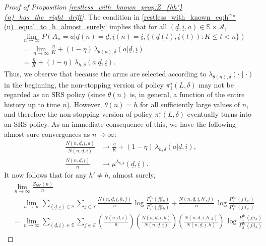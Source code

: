 \begin{proof}[Proof of Proposition \ref{restless_with_known_prop:Z_{hh'}(n)_has_the_right_drift}]
The condition in \eqref{restless_with_known_eq:h^*(n)_equal_to_h_almost_surely} implies that for all $(\underline{d},\underline{i},a)\in\mathbb{S}\times\mathcal{A}$,
\begin{align}
	&\lim\limits_{n\to\infty} P(A_n=a|\underline{d}(n)=\underline{d},\underline{i}(n)=\underline{i},\{(\underline{d}(t),\underline{i}(t)):K\leq t< n\})\nonumber\\
	&=\lim\limits_{n\to\infty}\frac{\eta}{K}+(1-\eta)\,\lambda_{\theta(n),\delta}(a|\underline{d},\underline{i})\nonumber\\
	&=\frac{\eta}{K}+(1-\eta)\,\lambda_{h,\delta}(a|\underline{d},\underline{i}).
\end{align}
Thus, we observe that because the arms are selected according to $\lambda_{\theta(n), \delta}(\cdot\mid \cdot)$ in the beginning, the non-stopping version of policy $\pi_1^\star(L, \delta)$ may not be regarded as an SRS policy (since $\theta(n)$ is, in general, a function of the entire history up to time $n$). However, $\theta(n)=h$ for all sufficiently large values of $n$, and therefore the non-stopping version of policy $\pi_1^\star(L, \delta)$ eventually turns into an SRS policy. As an immediate consequence of this, we have the following almost sure convergences as $n\to\infty$:
\begin{align}
	\frac{N(n,\underline{d},\underline{i},a)}{N(n,\underline{d},\underline{i})}&\longrightarrow \frac{\eta}{K}+(1-\eta)\,\lambda_{h,\delta}(a|\underline{d},\underline{i}),\label{restless_with_known_eq:limit_N(n,d,i,a)/N(n,d,i)}\\
	\frac{N(n,\underline{d},\underline{i})}{n}&\longrightarrow \mu^{\lambda_{h,\delta}}(\underline{d},\underline{i}).\label{restless_with_known_eq:limit_N(n,d,i)/n}
\end{align}
It now follows that for any $h'\neq h$, almost surely,
\begin{align}
	&\lim\limits_{n\to\infty}\frac{Z_{hh'}(n)}{n}\nonumber\\
	&=\lim\limits_{n\to\infty}\sum\limits_{(\underline{d},\underline{i})\in\mathbb{S}}\sum\limits_{j\in\mathcal{S}}\frac{N(n,\underline{d},\underline{i},h,j)}{n}\,\log\frac{P_1^{d_h}(j|i_h)}{P_2^{d_h}(j|i_h)}+\frac{N(n,\underline{d},\underline{i},h',j)}{n}\,\log\frac{P_2^{d_{h'}}(j|i_{h'})}{P_1^{d_{h'}}(j|i_{h'})}\nonumber\\
	&=\lim\limits_{n\to\infty}\sum\limits_{(\underline{d},\underline{i})\in\mathbb{S}}\sum\limits_{j\in\mathcal{S}}\left(\frac{N(n,\underline{d},\underline{i})}{n}\right)\left(\frac{N(n,\underline{d},\underline{i},h)}{N(n,\underline{d},\underline{i})}\right)\left(\frac{N(n,\underline{d},\underline{i},h,j)}{N(n,\underline{d},\underline{i},h)}\right)\,\log\frac{P_1^{d_h}(j|i_h)}{P_2^{d_h}(j|i_h)}\nonumber\\

\end{align}
\end{proof}
